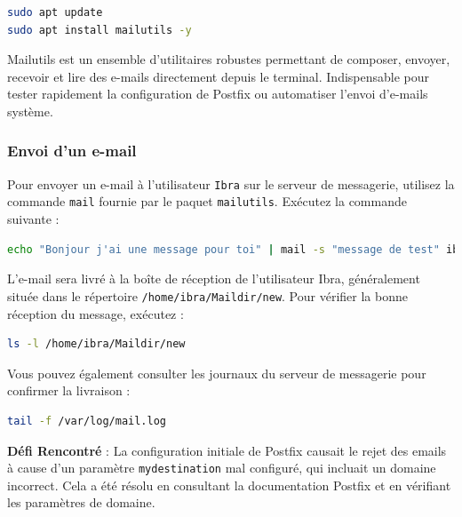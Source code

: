 \documentclass[a4paper,12pt]{article}
\begin{document}
\begin{lstlisting}[language=bash]
sudo apt update
sudo apt install mailutils -y
\end{lstlisting}

 Mailutils est un ensemble d'utilitaires robustes permettant de composer, envoyer, recevoir et lire des e-mails directement depuis le terminal. Indispensable pour tester rapidement la configuration de Postfix ou automatiser l’envoi d’e-mails système.
 
\subsubsection{Envoi d’un e-mail}

Pour envoyer un e-mail à l’utilisateur \texttt{Ibra} sur le serveur de messagerie, utilisez la commande \texttt{mail} fournie par le paquet \texttt{mailutils}. Exécutez la commande suivante :

\begin{lstlisting}[language=bash]
echo "Bonjour j'ai une message pour toi" | mail -s "message de test" ibra

\end{lstlisting}


L’e-mail sera livré à la boîte de réception de l’utilisateur Ibra, généralement située dans le répertoire \texttt{/home/ibra/Maildir/new}.
Pour vérifier la bonne réception du message, exécutez :

\begin{lstlisting}[language=bash]
ls -l /home/ibra/Maildir/new
\end{lstlisting}

Vous pouvez également consulter les journaux du serveur de messagerie pour confirmer la livraison :

\begin{lstlisting}[language=bash]
tail -f /var/log/mail.log
\end{lstlisting}
 
 

\textbf{Défi Rencontré} : La configuration initiale de Postfix causait le rejet des emails à cause d'un paramètre \texttt{mydestination} mal configuré, qui incluait un domaine incorrect. Cela a été résolu en consultant la documentation Postfix et en vérifiant les paramètres de domaine.
\end{document}
